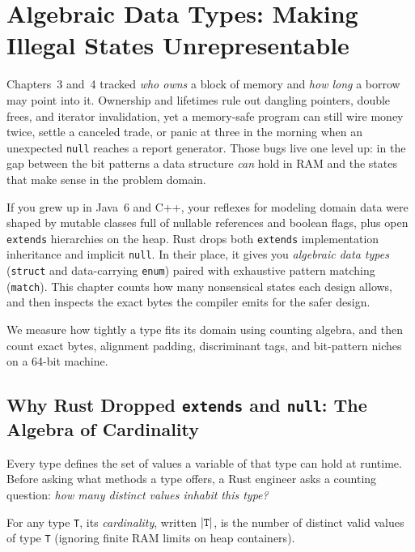 \chapter{Algebraic Data Types: Making Illegal States Unrepresentable}
\label{ch05:adts}

Chapters~3 and~4 tracked \emph{who owns} a block of memory and \emph{how long} a borrow may point into it. Ownership and lifetimes rule out dangling pointers, double frees, and iterator invalidation, yet a memory-safe program can still wire money twice, settle a canceled trade, or panic at three in the morning when an unexpected \texttt{null} reaches a report generator. Those bugs live one level up: in the gap between the bit patterns a data structure \emph{can} hold in RAM and the states that make sense in the problem domain.

If you grew up in Java~6 and C++, your reflexes for modeling domain data were shaped by mutable classes full of nullable references and boolean flags, plus open \texttt{extends} hierarchies on the heap. Rust drops both \texttt{extends} implementation inheritance and implicit \texttt{null}. In their place, it gives you \emph{algebraic data types} (\texttt{struct} and data-carrying \texttt{enum}) paired with exhaustive pattern matching (\texttt{match}). This chapter counts how many nonsensical states each design allows, and then inspects the exact bytes the compiler emits for the safer design.

We measure how tightly a type fits its domain using counting algebra, and then count exact bytes, alignment padding, discriminant tags, and bit-pattern niches on a 64-bit machine.

\chapterline

\section{Why Rust Dropped \texttt{extends} and \texttt{null}: The Algebra of Cardinality}
\label{ch05:cardinality}

Every type defines the set of values a variable of that type can hold at runtime. Before asking what methods a type offers, a Rust engineer asks a counting question: \emph{how many distinct values inhabit this type?}

\begin{definition}
\label{ch05:def-cardinality}
For any type \texttt{T}, its \emph{cardinality}, written $\lvert\texttt{T}\rvert$, is the number of distinct valid values of type \texttt{T} (ignoring finite RAM limits on heap containers).
\end{definition}

